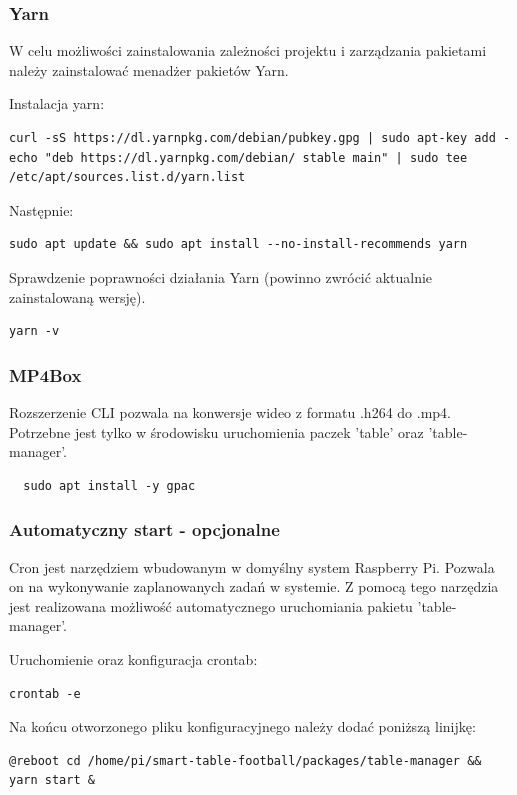 \subsubsection{Yarn}
W celu możliwości zainstalowania zależności projektu i zarządzania pakietami należy zainstalować menadżer pakietów Yarn.

Instalacja yarn:
\begin{lstlisting}[breaklines=true]
curl -sS https://dl.yarnpkg.com/debian/pubkey.gpg | sudo apt-key add -echo "deb https://dl.yarnpkg.com/debian/ stable main" | sudo tee /etc/apt/sources.list.d/yarn.list
\end{lstlisting}

Następnie:
\begin{lstlisting}[breaklines=true]
sudo apt update && sudo apt install --no-install-recommends yarn
\end{lstlisting}

Sprawdzenie poprawności działania Yarn (powinno zwrócić aktualnie zainstalowaną wersję).
\begin{lstlisting}
yarn -v
\end{lstlisting}


\subsubsection{MP4Box}
Rozszerzenie CLI pozwala na konwersje wideo z formatu .h264 do .mp4. Potrzebne jest tylko w środowisku uruchomienia paczek 'table' oraz 'table-manager'.

\begin{lstlisting}
  sudo apt install -y gpac
\end{lstlisting}


\subsubsection{Automatyczny start - opcjonalne}
Cron jest narzędziem wbudowanym w domyślny system Raspberry Pi. Pozwala on na wykonywanie zaplanowanych zadań w systemie. Z pomocą tego narzędzia jest realizowana możliwość automatycznego uruchomiania pakietu 'table-manager'. \cite{RaspCronDocs}

Uruchomienie oraz konfiguracja crontab:
\begin{lstlisting}
crontab -e
\end{lstlisting}

Na końcu otworzonego pliku konfiguracyjnego należy dodać poniższą linijkę:
\begin{lstlisting}[breaklines=true]
@reboot cd /home/pi/smart-table-football/packages/table-manager && yarn start &
\end{lstlisting}

